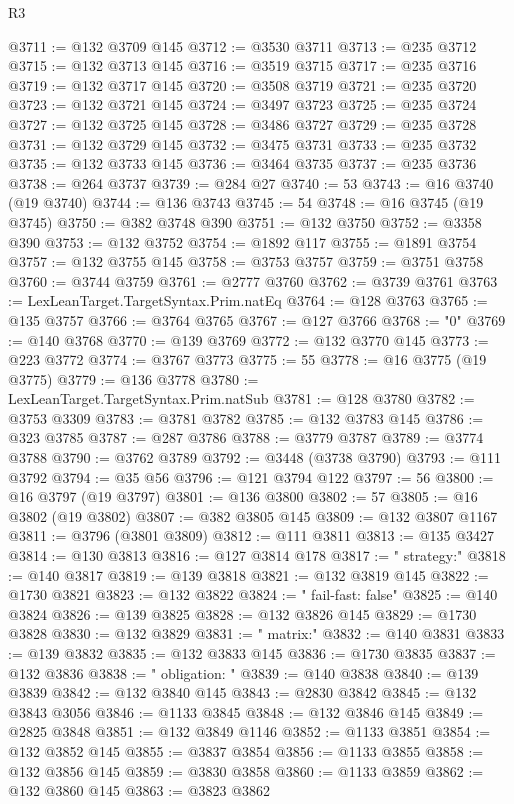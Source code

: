 \begin{lexlean}{R3}
\begin{coremodule}
@3711 := @132 @3709 @145
@3712 := @3530 @3711
@3713 := @235 @3712
@3715 := @132 @3713 @145
@3716 := @3519 @3715
@3717 := @235 @3716
@3719 := @132 @3717 @145
@3720 := @3508 @3719
@3721 := @235 @3720
@3723 := @132 @3721 @145
@3724 := @3497 @3723
@3725 := @235 @3724
@3727 := @132 @3725 @145
@3728 := @3486 @3727
@3729 := @235 @3728
@3731 := @132 @3729 @145
@3732 := @3475 @3731
@3733 := @235 @3732
@3735 := @132 @3733 @145
@3736 := @3464 @3735
@3737 := @235 @3736
@3738 := @264 @3737
@3739 := @284 @27
@3740 := 53
@3743 := @16 @3740 (@19 @3740)
@3744 := @136 @3743
@3745 := 54
@3748 := @16 @3745 (@19 @3745)
@3750 := @382 @3748 @390
@3751 := @132 @3750
@3752 := @3358 @390
@3753 := @132 @3752
@3754 := @1892 @117
@3755 := @1891 @3754
@3757 := @132 @3755 @145
@3758 := @3753 @3757
@3759 := @3751 @3758
@3760 := @3744 @3759
@3761 := @2777 @3760
@3762 := @3739 @3761
@3763 := LexLeanTarget.TargetSyntax.Prim.natEq
@3764 := @128 @3763
@3765 := @135 @3757
@3766 := @3764 @3765
@3767 := @127 @3766
@3768 := "0"
@3769 := @140 @3768
@3770 := @139 @3769
@3772 := @132 @3770 @145
@3773 := @223 @3772
@3774 := @3767 @3773
@3775 := 55
@3778 := @16 @3775 (@19 @3775)
@3779 := @136 @3778
@3780 := LexLeanTarget.TargetSyntax.Prim.natSub
@3781 := @128 @3780
@3782 := @3753 @3309
@3783 := @3781 @3782
@3785 := @132 @3783 @145
@3786 := @323 @3785
@3787 := @287 @3786
@3788 := @3779 @3787
@3789 := @3774 @3788
@3790 := @3762 @3789
@3792 := @3448 (@3738 @3790)
@3793 := @111 @3792
@3794 := @35 @56
@3796 := @121 @3794 @122
@3797 := 56
@3800 := @16 @3797 (@19 @3797)
@3801 := @136 @3800
@3802 := 57
@3805 := @16 @3802 (@19 @3802)
@3807 := @382 @3805 @145
@3809 := @132 @3807 @1167
@3811 := @3796 (@3801 @3809)
@3812 := @111 @3811
@3813 := @135 @3427
@3814 := @130 @3813
@3816 := @127 @3814 @178
@3817 := "    strategy:"
@3818 := @140 @3817
@3819 := @139 @3818
@3821 := @132 @3819 @145
@3822 := @1730 @3821
@3823 := @132 @3822
@3824 := "      fail-fast: false"
@3825 := @140 @3824
@3826 := @139 @3825
@3828 := @132 @3826 @145
@3829 := @1730 @3828
@3830 := @132 @3829
@3831 := "      matrix:"
@3832 := @140 @3831
@3833 := @139 @3832
@3835 := @132 @3833 @145
@3836 := @1730 @3835
@3837 := @132 @3836
@3838 := "        obligation: "
@3839 := @140 @3838
@3840 := @139 @3839
@3842 := @132 @3840 @145
@3843 := @2830 @3842
@3845 := @132 @3843 @3056
@3846 := @1133 @3845
@3848 := @132 @3846 @145
@3849 := @2825 @3848
@3851 := @132 @3849 @1146
@3852 := @1133 @3851
@3854 := @132 @3852 @145
@3855 := @3837 @3854
@3856 := @1133 @3855
@3858 := @132 @3856 @145
@3859 := @3830 @3858
@3860 := @1133 @3859
@3862 := @132 @3860 @145
@3863 := @3823 @3862

\end{coremodule}
\end{lexlean}
